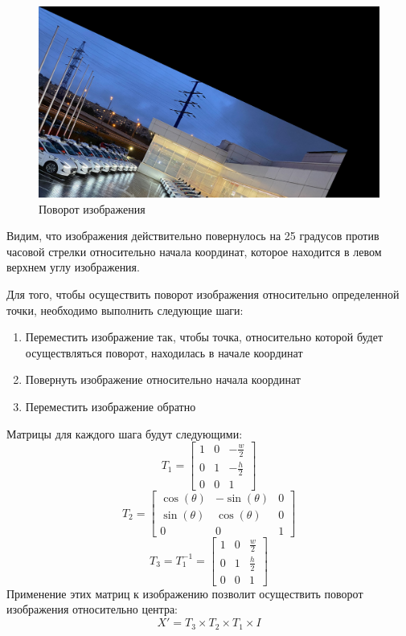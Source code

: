 \begin{figure}[ht]
    \includegraphics[width=\textwidth]{../outputs/image_rotate.png}
    \caption{Поворот изображения}
    \label{fig:rotate_image}
\end{figure}

Видим, что изображения действительно повернулось на 25 градусов против часовой стрелки относительно начала координат, 
которое находится в левом верхнем углу изображения.

Для того, чтобы осуществить поворот изображения относительно определенной точки, необходимо выполнить следующие шаги:

\begin{enumerate}
    \item Переместить изображение так, чтобы точка, относительно которой будет осуществляться поворот, находилась в начале координат
    \item Повернуть изображение относительно начала координат
    \item Переместить изображение обратно
\end{enumerate}

Матрицы для каждого шага будут следующими:
\begin{equation}
T_1 = \begin{bmatrix}
    1 & 0 & -\frac{w}{2} \\
    0 & 1 & -\frac{h}{2} \\
    0 & 0 & 1
\end{bmatrix}
\end{equation}
\begin{equation}
T_2 = \begin{bmatrix}
    \cos(\theta) & -\sin(\theta) & 0 \\
    \sin(\theta) & \cos(\theta) & 0 \\
    0 & 0 & 1
\end{bmatrix}
\end{equation}
\begin{equation}
T_3 = T_1^{-1} = \begin{bmatrix}
    1 & 0 & \frac{w}{2} \\
    0 & 1 & \frac{h}{2} \\
    0 & 0 & 1
\end{bmatrix}
\end{equation}
Применение этих матриц к изображению позволит осуществить поворот изображения относительно центра:
\begin{equation}
    X' = T_3 \times T_2 \times T_1 \times I
\end{equation}

